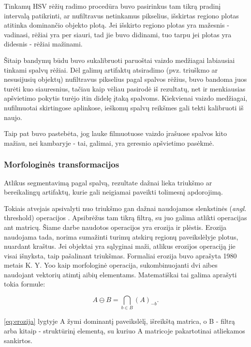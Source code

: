 \documentclass{VUMIFPSbakalaurinis}
\begin{document}
Tinkamų HSV rėžių radimo procedūra buvo pasirinkus tam tikrą pradinį intervalą patikrinti, ar nufiltravus netinkamus pikselius, išskirtas regiono plotas atitinka dominančio objekto plotą. Jei išskirto regiono plotas yra mažesnis - vadinasi, rėžiai yra per siauri, tad jie buvo didinami, tuo tarpu jei plotas yra didesnis - rėžiai mažinami. 

Šitaip bandymų būdu buvo sukalibruoti paruoštai vaizdo medžiagai labiausiai tinkami spalvų rėžiai. Dėl galimų artifaktų atsiradimo (pvz. triuškmo ar nesusijusių objektų) nufiltravus pikselius pagal spalvos rėžius, buvo bandoma juos turėti kuo siauresnius, tačiau kaip vėliau pasirodė iš rezultatų, net ir menkiausias apšvietimo pokytis turėjo itin didelę įtaką spalvoms. Kiekvienai vaizdo medžiagai, nufilmuotai skirtingose aplinkose, ieškomų spalvų reikšmes gali tekti kalibruoti iš naujo.

Taip pat buvo pastebėta, jog lauke filmuotuose vaizdo įrašuose spalvos kito mažiau, nei kambaryje - tai, galimai, yra geresnio apšvietimo pasėkmė. 

\subsubsection{Morfologinės transformacijos}
Atlikus segmentavimą pagal spalvą, rezultate dažnai lieka triukšmo ar bereikalingų artifaktų, kurie gali neigiamai paveikti tolimesnį apdorojimą.

Tokiais atvejais apsivalyti nuo triukšmo gan dažnai naudojamos slenkstinės (\textit{angl.} threshold) operacijos \cite[112]{SzeliskiCompVision}. Apsibrėžus tam tikrą filtrą, su juo galima atlikti operacijas ant matricų. Šiame darbe naudotos operacijos yra erozija ir plėstis. Erozija naudojama tada, norima sumažinti turimų atskirų regionų paveikslėlyje plotus, nuardant kraštus. Jei objektai yra sąlyginai maži, atlikus erozijos operaciją jie visai išnyksta, taip pašalinant triukšmas. Formaliai erozija buvo aprašyta 1980 metais K. Y. Yoo \cite{4767941} kaip morfologinė operacija, sukombinuojanti dvi aibes naudojant vektorių atimtį aibių elementams. Matematiškai tai galima aprašyti tokia formule: 

\begin{equation}\label{eq:erozija}
	A \ominus B = \bigcap_ {b \in B } (A)_{-b} .
\end{equation}

\ref{eq:erozija} lygtyje A žymi dominantį paveikslėlį, išreikštą matrica, o B - filtrą arba kitaip - struktūrinį elementą, su kuriuo A matricoje pakartotinai atliekamos sankirtos.  
\end{document}
